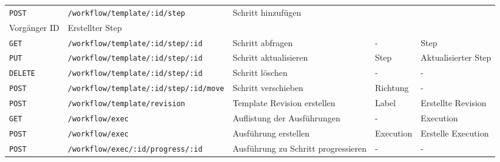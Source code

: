 \begin{footnotesize}
\begin{landscape}
\begin{longtable}{l|l|l|l|l}
\texttt{POST}   & \texttt{/workflow/template/:id/step}          & Schritt hinzufügen                  & \begin{tabular}[c]{@{}l@{}}Step\\ Vorgänger ID\end{tabular} & Erstellter Step                                                         \\ \hline
\texttt{GET}    & \texttt{/workflow/template/:id/step/:id}      & Schritt abfragen                    & -                                                           & Step                                                                    \\ \hline
\texttt{PUT}    & \texttt{/workflow/template/:id/step/:id}      & Schritt aktualisieren               & Step                                                        & Aktualisierter Step                                                     \\ \hline
\texttt{DELETE} & \texttt{/workflow/template/:id/step/:id}      & Schritt löschen                     & -                                                           & -                                                                       \\ \hline
\texttt{POST}   & \texttt{/workflow/template/:id/step/:id/move} & Schritt verschieben                 & Richtung                                                    & -                                                                       \\ \hline
\texttt{POST}   & \texttt{/workflow/template/revision}          & Template Revision erstellen         & Label                                                       & Erstellte Revision                                                      \\ \hline
\texttt{GET}    & \texttt{/workflow/exec}                       & Auflistung der Ausführungen         & -                                                           & Execution                                                               \\ \hline
\texttt{POST}   & \texttt{/workflow/exec}                       & Ausführung erstellen                & Execution                                                   & Erstelle Execution                                                      \\ \hline
\texttt{POST}   & \texttt{/workflow/exec/:id/progress/:id}      & Ausführung zu Schritt progressieren & -                                                           & -                                                                       \\ \hline

\end{longtable}
\end{landscape}
\end{footnotesize}
